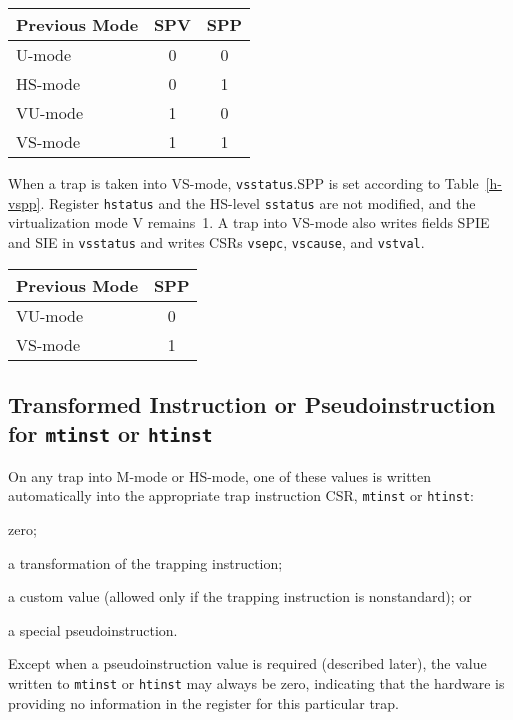 \begin{table*}[h!]
\begin{center}
\begin{tabular}{|l|c|c|}
  \hline
  Previous Mode & SPV & SPP \\ \hline
  U-mode        & 0   & 0   \\
  HS-mode       & 0   & 1   \\ \hline
  VU-mode       & 1   & 0   \\
  VS-mode       & 1   & 1   \\ \hline
\end{tabular}
\end{center}
\caption{Value of {\tt hstatus} field SPV and {\tt sstatus} field SPP after a trap into HS-mode.}
\label{h-spp}
\end{table*}

When a trap is taken into VS-mode, {\tt vsstatus}.SPP is set according to
Table~\ref{h-vspp}.
Register {\tt hstatus} and the HS-level {\tt sstatus} are not modified,
and the virtualization mode V remains~1.
A trap into VS-mode also writes fields SPIE and SIE in
{\tt vsstatus} and writes CSRs {\tt vsepc}, {\tt vscause}, and
{\tt vstval}.

\begin{table*}[h!]
\begin{center}
\begin{tabular}{|l|c|}
  \hline
  Previous Mode & SPP \\ \hline
  VU-mode       & 0   \\
  VS-mode       & 1   \\ \hline
\end{tabular}
\end{center}
\caption{Value of {\tt vsstatus} field SPP after a trap into VS-mode.}
\label{h-vspp}
\end{table*}

\FloatBarrier

\subsection{Transformed Instruction or Pseudoinstruction for {\tt mtinst} or {\tt htinst}}
\label{sec:tinst-vals}

On any trap into M-mode or HS-mode, one of these values is written
automatically into the appropriate trap instruction CSR, {\tt mtinst} or
{\tt htinst}:
\begin{tightlist}
\item
zero;
\item
a transformation of the trapping instruction;
\item
a custom value (allowed only if the trapping instruction is nonstandard);
or
\item
a special pseudoinstruction.
\end{tightlist}
Except when a pseudoinstruction value is required (described later), the
value written to {\tt mtinst} or {\tt htinst} may always be zero,
indicating that the hardware is providing no information in the register
for this particular trap.

